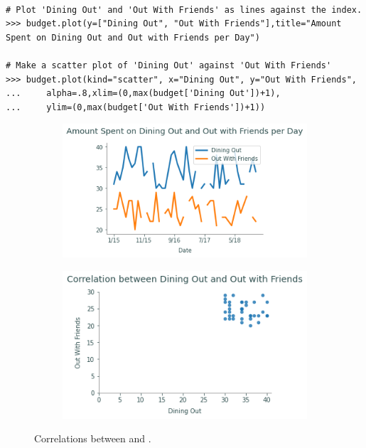 \begin{lstlisting}

# Plot 'Dining Out' and 'Out With Friends' as lines against the index.
>>> budget.plot(y=["Dining Out", "Out With Friends"],title="Amount Spent on Dining Out and Out with Friends per Day")

# Make a scatter plot of 'Dining Out' against 'Out With Friends'
>>> budget.plot(kind="scatter", x="Dining Out", y="Out With Friends",
... 	alpha=.8,xlim=(0,max(budget['Dining Out'])+1),
...		ylim=(0,max(budget['Out With Friends'])+1))
\end{lstlisting}

\begin{figure}[H] 
\captionsetup[subfigure]{justification=centering}
\centering
\begin{subfigure}{.49\textwidth}
    \includegraphics[width=\textwidth]{figures/line_compare.pdf}
\end{subfigure}
%
\begin{subfigure}{.49\textwidth}
    \includegraphics[width=\textwidth]{figures/scatter_compare.pdf}
\end{subfigure}
\caption{Correlations between  and .}
\end{figure}

